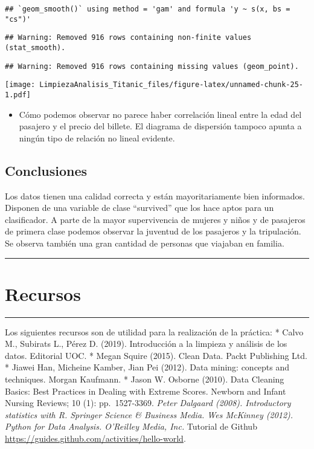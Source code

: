 \documentclass[
]{article}
\providecommand{\tightlist}{%
  \setlength{\itemsep}{0pt}\setlength{\parskip}{0pt}}
\begin{document}
\begin{verbatim}
## `geom_smooth()` using method = 'gam' and formula 'y ~ s(x, bs = "cs")'
\end{verbatim}

\begin{verbatim}
## Warning: Removed 916 rows containing non-finite values (stat_smooth).
\end{verbatim}

\begin{verbatim}
## Warning: Removed 916 rows containing missing values (geom_point).
\end{verbatim}

\texttt{[image: LimpiezaAnalisis\_Titanic\_files/figure-latex/unnamed-chunk-25-1.pdf]}

\begin{itemize}
\tightlist
\item
  Cómo podemos observar no parece haber correlación lineal entre la edad
  del pasajero y el precio del billete. El diagrama de dispersión
  tampoco apunta a ningún tipo de relación no lineal evidente.
\end{itemize}

\hypertarget{conclusiones}{%
\subsection{Conclusiones}\label{conclusiones}}

Los datos tienen una calidad correcta y están mayoritariamente bien
informados. Disponen de una variable de clase ``survived'' que los hace
aptos para un clasificador. A parte de la mayor supervivencia de mujeres
y niños y de pasajeros de primera clase podemos observar la juventud de
los pasajeros y la tripulación. Se observa también una gran cantidad de
personas que viajaban en familia.

\begin{center}\rule{0.5\linewidth}{0.5pt}\end{center}

\hypertarget{recursos}{%
\section{Recursos}\label{recursos}}

\begin{center}\rule{0.5\linewidth}{0.5pt}\end{center}

Los siguientes recursos son de utilidad para la realización de la
práctica: * Calvo M., Subirats L., Pérez D. (2019). Introducción a la
limpieza y análisis de los datos. Editorial UOC. * Megan Squire (2015).
Clean Data. Packt Publishing Ltd. * Jiawei Han, Micheine Kamber, Jian
Pei (2012). Data mining: concepts and techniques. Morgan Kaufmann. *
Jason W. Osborne (2010). Data Cleaning Basics: Best Practices in Dealing
with Extreme Scores. Newborn and Infant Nursing Reviews; 10 (1):
pp.~1527-3369. \emph{Peter Dalgaard (2008). Introductory statistics with
R. Springer Science \& Business Media. Wes McKinney (2012). Python for
Data Analysis. O'Reilley Media, Inc. } Tutorial de Github
\url{https://guides.github.com/activities/hello-world}.
\end{document}
